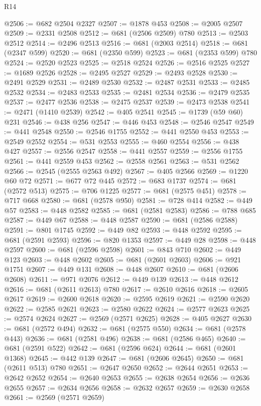 \begin{lexlean}{R14}
\begin{coremodule}
@2506 := @682 @2504 @2327
@2507 := @1878 @453
@2508 := @2005 @2507
@2509 := @2331 @2508
@2512 := @681 (@2506 @2509) @780
@2513 := @2503 @2512
@2514 := @2496 @2513
@2516 := @681 (@2003 @2514)
@2518 := @681 (@2347 @599)
@2520 := @681 (@2350 @599)
@2523 := @681 (@2353 @599) @780
@2524 := @2520 @2523
@2525 := @2518 @2524
@2526 := @2516 @2525
@2527 := @1689 @2526
@2528 := @2495 @2527
@2529 := @2493 @2528
@2530 := @2491 @2529
@2531 := @2489 @2530
@2532 := @2487 @2531
@2533 := @2485 @2532
@2534 := @2483 @2533
@2535 := @2481 @2534
@2536 := @2479 @2535
@2537 := @2477 @2536
@2538 := @2475 @2537
@2539 := @2473 @2538
@2541 := @2471 (@1410 @2539)
@2542 := @405 @2541
@2545 := @1739 (@59 @60) @231
@2546 := @438 @256
@2547 := @446 @453
@2548 := @2546 @2547
@2549 := @441 @2548
@2550 := @2546 @1755
@2552 := @441 @2550 @453
@2553 := @2549 @2552
@2554 := @531 @2553
@2555 := @460 @2554
@2556 := @438 @427
@2557 := @2556 @2547
@2558 := @441 @2557
@2559 := @2556 @1755
@2561 := @441 @2559 @453
@2562 := @2558 @2561
@2563 := @531 @2562
@2566 := @2545 (@2555 @2563 @492)
@2567 := @405 @2566
@2569 := @1220 @60 @72
@2571 := @677 @72 @445
@2572 := @683 @1737
@2574 := @681 (@2572 @513)
@2575 := @706 @1225
@2577 := @681 (@2575 @451)
@2578 := @717 @668
@2580 := @681 (@2578 @950)
@2581 := @728 @414
@2582 := @449 @57
@2583 := @448 @2582
@2585 := @681 (@2581 @2583)
@2586 := @788 @685
@2587 := @449 @67
@2588 := @448 @2587
@2590 := @681 (@2586 @2588)
@2591 := @801 @1745
@2592 := @449 @82
@2593 := @448 @2592
@2595 := @681 (@2591 @2593)
@2596 := @820 @1353
@2597 := @449 @28
@2598 := @448 @2597
@2600 := @681 (@2596 @2598)
@2601 := @843 @710
@2602 := @449 @123
@2603 := @448 @2602
@2605 := @681 (@2601 @2603)
@2606 := @921 @1751
@2607 := @449 @131
@2608 := @448 @2607
@2610 := @681 (@2606 @2608)
@2611 := @971 @2076
@2612 := @449 @139
@2613 := @448 @2612
@2616 := @681 (@2611 @2613) @780
@2617 := @2610 @2616
@2618 := @2605 @2617
@2619 := @2600 @2618
@2620 := @2595 @2619
@2621 := @2590 @2620
@2622 := @2585 @2621
@2623 := @2580 @2622
@2624 := @2577 @2623
@2625 := @2574 @2624
@2627 := @2569 (@2571 @2625)
@2628 := @405 @2627
@2630 := @681 (@2572 @494)
@2632 := @681 (@2575 @550)
@2634 := @681 (@2578 @443)
@2636 := @681 (@2581 @496)
@2638 := @681 (@2586 @465)
@2640 := @681 (@2591 @522)
@2642 := @681 (@2596 @624)
@2644 := @681 (@2601 @1368)
@2645 := @442 @139
@2647 := @681 (@2606 @2645)
@2650 := @681 (@2611 @513) @780
@2651 := @2647 @2650
@2652 := @2644 @2651
@2653 := @2642 @2652
@2654 := @2640 @2653
@2655 := @2638 @2654
@2656 := @2636 @2655
@2657 := @2634 @2656
@2658 := @2632 @2657
@2659 := @2630 @2658
@2661 := @2569 (@2571 @2659)

\end{coremodule}
\end{lexlean}
